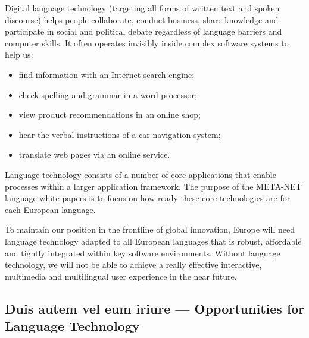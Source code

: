 \documentclass[]{../metanetpaper}
\begin{document}
\begin{Parallel}[c]{80mm}{80mm}
{    Digital language technology (targeting all forms of written text and spoken discourse) helps people collaborate, conduct business, share knowledge and participate in social and political debate regardless of language barriers and computer skills. It often operates invisibly inside complex software systems to help us:
    \begin{itemize}
      \item find information with an Internet search engine;
      \item check spelling and grammar in a word processor;
      \item view product recommendations in an online shop;
      \item hear the verbal instructions of a car navigation system;
      \item translate web pages via an online service.
    \end{itemize}
    Language technology consists of a number of core applications that enable processes within a larger application framework. The purpose of the META-NET language white papers is to focus on how ready these core technologies are for each European language. 

    To maintain our position in the frontline of global innovation, Europe will need language technology adapted to all European languages that is robust, affordable and tightly integrated within key software environments. Without language technology, we will not be able to achieve a really effective interactive, multimedia and multilingual user experience in the near future.
  }
  
  \ParallelPar


  \subsection{Duis autem vel eum iriure --- Opportunities for Language Technology }

\end{Parallel}
\end{document}
